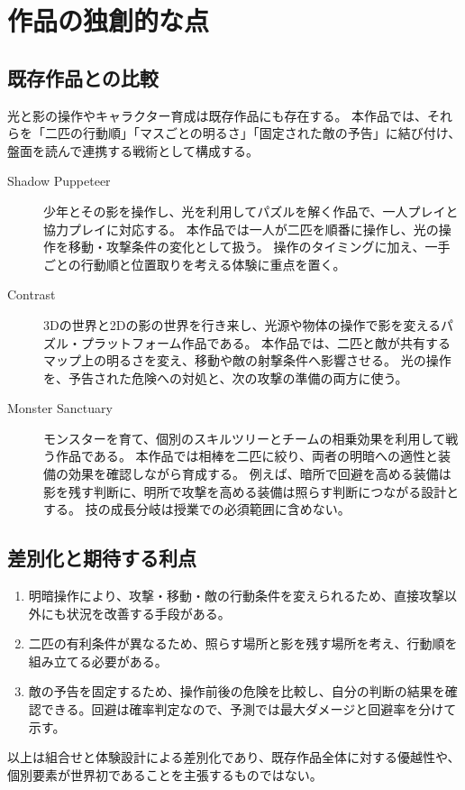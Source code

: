 \documentclass[a4paper,11pt,dvipdfmx]{jsarticle}
\begin{document}
\section{作品の独創的な点}
\subsection{既存作品との比較}
光と影の操作やキャラクター育成は既存作品にも存在する。
本作品では、それらを「二匹の行動順」「マスごとの明るさ」「固定された敵の予告」に結び付け、盤面を読んで連携する戦術として構成する。

\begin{description}
\item[Shadow Puppeteer]
少年とその影を操作し、光を利用してパズルを解く作品で、一人プレイと協力プレイに対応する\cite{puppeteer}。
本作品では一人が二匹を順番に操作し、光の操作を移動・攻撃条件の変化として扱う。
操作のタイミングに加え、一手ごとの行動順と位置取りを考える体験に重点を置く。

\item[Contrast]
3Dの世界と2Dの影の世界を行き来し、光源や物体の操作で影を変えるパズル・プラットフォーム作品である\cite{contrast}。
本作品では、二匹と敵が共有するマップ上の明るさを変え、移動や敵の射撃条件へ影響させる。
光の操作を、予告された危険への対処と、次の攻撃の準備の両方に使う。

\item[Monster Sanctuary]
モンスターを育て、個別のスキルツリーとチームの相乗効果を利用して戦う作品である\cite{sanctuary}。
本作品では相棒を二匹に絞り、両者の明暗への適性と装備の効果を確認しながら育成する。
例えば、暗所で回避を高める装備は影を残す判断に、明所で攻撃を高める装備は照らす判断につながる設計とする。
技の成長分岐は授業での必須範囲に含めない。
\end{description}

\subsection{差別化と期待する利点}
\begin{enumerate}
\item 明暗操作により、攻撃・移動・敵の行動条件を変えられるため、直接攻撃以外にも状況を改善する手段がある。
\item 二匹の有利条件が異なるため、照らす場所と影を残す場所を考え、行動順を組み立てる必要がある。
\item 敵の予告を固定するため、操作前後の危険を比較し、自分の判断の結果を確認できる。回避は確率判定なので、予測では最大ダメージと回避率を分けて示す。
\end{enumerate}
以上は組合せと体験設計による差別化であり、既存作品全体に対する優越性や、個別要素が世界初であることを主張するものではない。
\end{document}
